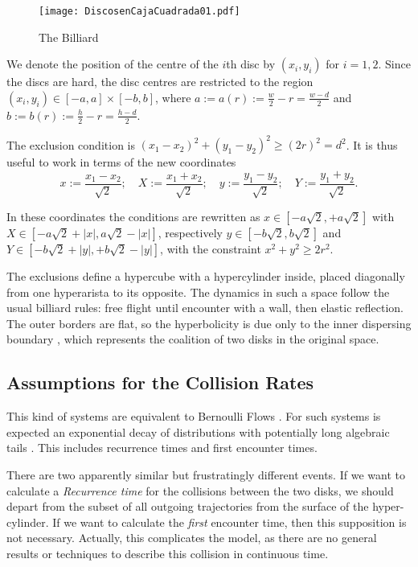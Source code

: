 \documentclass[a4paper,10pt, jcp, aps, preprint]{revtex4-1}
\newcommand{\defeq}{:=}
\begin{document}
\begin{figure}[h]
  \centering
  \texttt{[image: DiscosenCajaCuadrada01.pdf]}
  \caption{The Billiard}\label{billar01}
\end{figure}


We denote the position of the centre of the $i$th disc by 
$(x_{i}, y_{i})$ for $i=1,2$. Since the discs are hard, 
the disc centres are restricted to the region 
$(x_i, y_i) \in [-a,a] \times [-b, b]$, where 
$a \defeq a(r) \defeq \frac{w}{2} - r = \frac{w-d}{2}$ and
 $b \defeq b(r) \defeq \frac{h}{2} - r = \frac{h-d}{2}$.


The exclusion condition is $(x_1-x_2)^2 + (y_1-y_2)^2 \ge (2r)^2 = d^2$.
It is thus useful to work in terms of the new coordinates
\begin{equation}\label{cambiocoor01}
 x \defeq \frac{x_1 - x_2}{\sqrt{2}}; 
\quad X \defeq \frac{x_1 + x_2}{\sqrt{2}}; 
\quad y \defeq \frac{y_1 - y_2}{\sqrt{2}}; 
\quad Y \defeq \frac{y_1 + y_2}{\sqrt{2}}.
\end{equation}


In these coordinates the conditions are rewritten as
$x \in [-a \sqrt{2}, +a \sqrt{2}]$ with 
$X \in [-a \sqrt{2} + |x|, a \sqrt{2} - |x|]$, respectively 
 $y \in [-b \sqrt{2}, b \sqrt{2}]$ and $Y \in [-b \sqrt{2} + |y|, +b \sqrt{2} - |y|]$,  
with the constraint $x^2 + y^2 \ge 2 r^2$.

The exclusions define a hypercube with a hypercylinder inside, placed diagonally 
from one hyperarista to its opposite. 
The dynamics in such a space follow
the usual billiard rules: free flight until
encounter with a wall, then elastic reflection.
The outer borders are flat, so the
hyperbolicity is due only to the inner dispersing
boundary \cite{Sim99}, which represents the coalition of
two disks in the original space.


\subsection{Assumptions for the Collision Rates}

This kind of systems are equivalent to Bernoulli Flows \cite{Gallavotti74}.
For such systems is expected an exponential decay of 
distributions \cite{AbadiGalves} with potentially
long algebraic tails \cite{ZasTip}. 
This includes recurrence times and
first encounter times. 

There are two apparently similar but frustratingly different events.
If we want to calculate a \emph{Recurrence time} for the collisions 
between the two disks, 
we should depart from the subset of all outgoing trajectories from the surface of the
hyper-cylinder. 
If we want to calculate the \emph{first} encounter time, then
this supposition is not necessary.
 Actually, this complicates
the model, as there are no general results or 
techniques to describe this collision in continuous time. 
\end{document}
